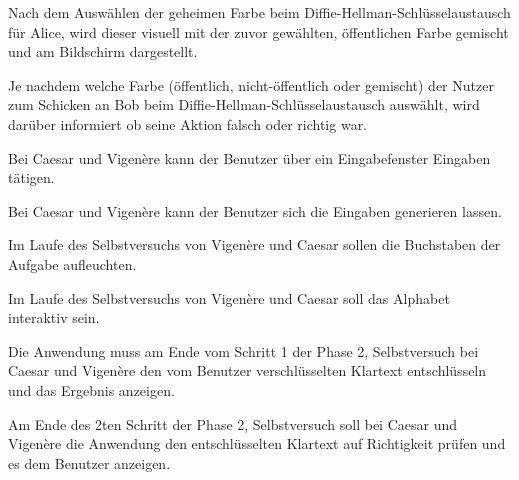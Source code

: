 \documentclass{article}
\begin{document}
\begin{T}[start = 30]
 \item Nach dem Auswählen der geheimen Farbe beim Diffie-Hellman-Schlüsselaustausch für Alice, wird dieser visuell mit der zuvor gewählten, öffentlichen Farbe gemischt und am Bildschirm dargestellt.
\end{T}

\begin{T}[start = 40]
 \item Je nachdem welche Farbe (öffentlich, nicht-öffentlich oder gemischt) der Nutzer zum Schicken an Bob beim Diffie-Hellman-Schlüsselaustausch auswählt, wird darüber informiert ob seine Aktion falsch oder richtig war.
\end{T}

\begin{T}[start = 50]
 \item Bei Caesar und Vigenère kann der Benutzer über ein Eingabefenster Eingaben tätigen.
\end{T}

\begin{T}[start = 60]
 \item Bei Caesar und Vigenère kann der Benutzer sich die Eingaben generieren lassen.
\end{T}

\begin{T}[start = 70]
 \item Im Laufe des Selbstversuchs von Vigenère und Caesar sollen die Buchstaben der Aufgabe aufleuchten.
\end{T}

\begin{T}[start = 80]
 \item Im Laufe des Selbstversuchs von Vigenère und Caesar soll das Alphabet interaktiv sein.
\end{T}

\begin{T}[start = 90]
 \item Die Anwendung muss am Ende vom Schritt 1 der Phase 2, Selbstversuch bei Caesar und Vigenère den vom 
       Benutzer verschlüsselten Klartext entschlüsseln und das Ergebnis anzeigen.
\end{T}

\begin{T}[start = 100]
 \item Am Ende des 2ten Schritt der Phase 2, Selbstversuch soll bei Caesar und Vigenère die Anwendung den entschlüsselten Klartext 
       auf Richtigkeit prüfen und es dem Benutzer anzeigen.
\end{T}
\end{document}
